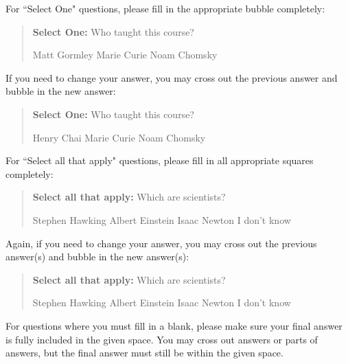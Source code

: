 \documentclass[11pt,addpoints,answers]{exam}
\newcommand{\blackcircle}{\tikz\draw[black,fill=black] (0,0) circle (1ex);}
\begin{document}
For ``Select One" questions, please fill in the appropriate bubble completely:

\begin{quote}
\textbf{Select One:} Who taught this course?
    \begin{checkboxes}
     \CorrectChoice Matt Gormley
     \choice Marie Curie
     \choice Noam Chomsky
    \end{checkboxes}
\end{quote}

If you need to change your answer, you may cross out the previous answer and bubble in the new answer:

\begin{quote}
\textbf{Select One:} Who taught this course?
    {
    \begin{checkboxes}
     \CorrectChoice Henry Chai
     \choice Marie Curie \checkboxchar{\xcancel{\blackcircle}{}}
     \choice Noam Chomsky
    \end{checkboxes}
    }
\end{quote}

For ``Select all that apply" questions, please fill in all appropriate squares completely:

\begin{quote}
\textbf{Select all that apply:} Which are scientists?
    {%
    \checkboxchar{$\Box$} \checkedchar{$\blacksquare$} %
    \begin{checkboxes}
    \CorrectChoice Stephen Hawking 
    \CorrectChoice Albert Einstein
    \CorrectChoice Isaac Newton
    \choice I don't know
    \end{checkboxes}
    }
\end{quote}

Again, if you need to change your answer, you may cross out the previous answer(s) and bubble in the new answer(s):

\begin{quote}
\textbf{Select all that apply:} Which are scientists?
    {%
    \checkboxchar{\xcancel{$\blacksquare$}} \checkedchar{$\blacksquare$} %
    \begin{checkboxes}
    \CorrectChoice Stephen Hawking 
    \CorrectChoice Albert Einstein
    \CorrectChoice Isaac Newton
    \choice I don't know
    \end{checkboxes}
    }
\end{quote}

For questions where you must fill in a blank, please make sure your final answer is fully included in the given space. You may cross out answers or parts of answers, but the final answer must still be within the given space.
\end{document}
